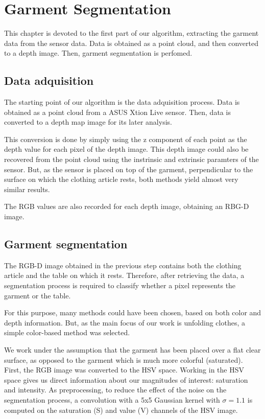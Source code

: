 \chapter{Garment Segmentation}
\label{garment_segmentation}
This chapter is devoted to the first part of our algorithm, extracting the garment data from the sensor data. Data is obtained as a point cloud, and then converted to a depth image. Then, garment segmentation is perfomed.

\section{Data adquisition}
\label{data_adquisition}

The starting point of our algorithm is the data adquisition process. Data is obtained as a point cloud from a ASUS Xtion Live sensor. Then, data is converted to a depth map image for its later analysis. 

This conversion is done by simply using the z component of each point as the depth value for each pixel of the depth image. This depth image could also be recovered from the point cloud using the instrinsic and extrinsic paramters of the sensor. But, as the sensor is placed on top of the garment, perpendicular to the surface on which the clothing article rests, both methods yield almost very similar results.


The RGB values are also recorded for each depth image, obtaining an RBG-D image.

\section{Garment segmentation}
\label{garment_segmentation_mask}

The RGB-D image obtained in the previous step contains both the clothing article and the table on which it rests. Therefore, after retrieving the data, a segmentation process is required to classify whether a pixel represents the garment or the table.

For this purpose, many methods could have been chosen, based on both color and depth information. But, as the main focus of our work is unfolding clothes, a simple color-based method was selected. 

We work under the assumption that the garment has been placed over a flat clear surface, as opposed to the garment which is much more colorful (saturated). First, the RGB image was converted to the HSV space. Working in the HSV space gives us direct information about our magnitudes of interest: saturation and intensity. As preprocessing, to reduce the effect of the noise on the segmentation process, a convolution with a 5x5 Gaussian kernel with $\sigma=1.1$ is computed on the saturation (S) and value (V) channels of the HSV image.

